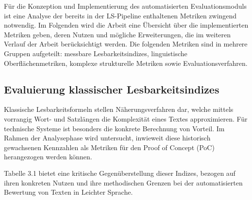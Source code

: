 
Für die Konzeption und Implementierung des automatisierten Evaluationsmoduls ist eine Analyse der bereits in der LS-Pipeline enthaltenen Metriken zwingend notwendig. Im Folgenden wird die Arbeit eine Übersicht über die implementierten Metriken geben, deren Nutzen und mögliche Erweiterungen, die im weiteren Verlauf der Arbeit berücksichtigt werden. Die folgenden Metriken sind in mehrere Gruppen aufgeteilt: messbare Lesbarkeitsindizes, linguistische Oberflächenmetriken, komplexe strukturelle Metriken sowie Evaluationsverfahren.

\subsection{Evaluierung klassischer Lesbarkeitsindizes}
Klassische Lesbarkeitsformeln stellen Näherungsverfahren dar, welche mittels vorrangig Wort- und Satzlängen die Komplexität eines Textes approximieren.
Für technische Systeme ist besonders die konkrete Berechnung von Vorteil. 
Im Rahmen der Analysephase wird untersucht, inwieweit diese historisch gewachsenen Kennzahlen als Metriken für den Proof of Concept (PoC) herangezogen werden können. 

Tabelle 3.1 bietet eine kritische Gegenüberstellung dieser Indizes, bezogen auf ihren konkreten Nutzen und ihre methodischen Grenzen bei der automatisierten Bewertung von Texten in Leichter Sprache.

